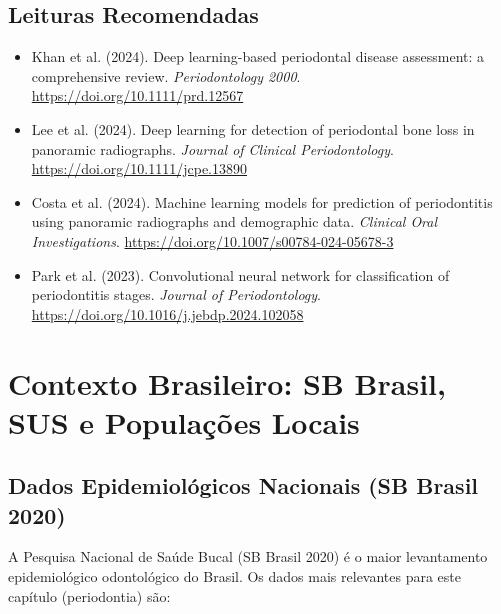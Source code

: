 \subsection*{Leituras Recomendadas}
\begin{itemize}
    \item Khan et al. (2024). Deep learning-based periodontal disease assessment: a comprehensive review. \textit{Periodontology 2000}. \url{https://doi.org/10.1111/prd.12567}
    \item Lee et al. (2024). Deep learning for detection of periodontal bone loss in panoramic radiographs. \textit{Journal of Clinical Periodontology}. \url{https://doi.org/10.1111/jcpe.13890}
    \item Costa et al. (2024). Machine learning models for prediction of periodontitis using panoramic radiographs and demographic data. \textit{Clinical Oral Investigations}. \url{https://doi.org/10.1007/s00784-024-05678-3}
    \item Park et al. (2023). Convolutional neural network for classification of periodontitis stages. \textit{Journal of Periodontology}. \url{https://doi.org/10.1016/j.jebdp.2024.102058}
\end{itemize}



\section{Contexto Brasileiro: SB Brasil, SUS e Populações Locais}


\subsection*{Dados Epidemiológicos Nacionais (SB Brasil 2020)}

A Pesquisa Nacional de Saúde Bucal (SB Brasil 2020) \cite{sbbrasil2020}
é o maior levantamento epidemiológico odontológico do Brasil. Os
dados mais relevantes para este capítulo (periodontia) são:

